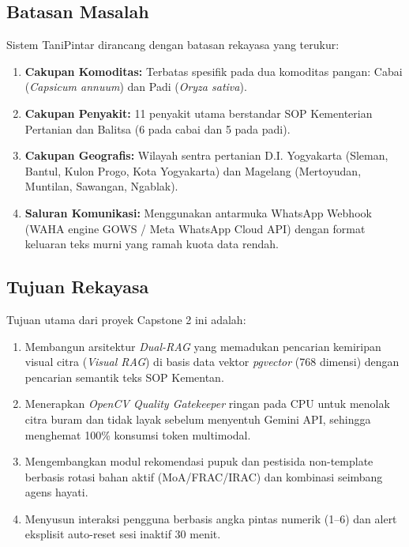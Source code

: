 \documentclass[11pt,a4paper]{article}
\begin{document}
\subsection{Batasan Masalah}
Sistem TaniPintar dirancang dengan batasan rekayasa yang terukur:
\begin{enumerate}
    \item \textbf{Cakupan Komoditas:} Terbatas spesifik pada dua komoditas pangan: Cabai (\textit{Capsicum annuum}) dan Padi (\textit{Oryza sativa}).
    \item \textbf{Cakupan Penyakit:} 11 penyakit utama berstandar SOP Kementerian Pertanian dan Balitsa (6 pada cabai dan 5 pada padi).
    \item \textbf{Cakupan Geografis:} Wilayah sentra pertanian D.I. Yogyakarta (Sleman, Bantul, Kulon Progo, Kota Yogyakarta) dan Magelang (Mertoyudan, Muntilan, Sawangan, Ngablak).
    \item \textbf{Saluran Komunikasi:} Menggunakan antarmuka WhatsApp Webhook (WAHA engine GOWS / Meta WhatsApp Cloud API) dengan format keluaran teks murni yang ramah kuota data rendah.
\end{enumerate}

\subsection{Tujuan Rekayasa}
Tujuan utama dari proyek Capstone 2 ini adalah:
\begin{enumerate}
    \item Membangun arsitektur \textit{Dual-RAG} yang memadukan pencarian kemiripan visual citra (\textit{Visual RAG}) di basis data vektor \textit{pgvector} (768 dimensi) dengan pencarian semantik teks SOP Kementan.
    \item Menerapkan \textit{OpenCV Quality Gatekeeper} ringan pada CPU untuk menolak citra buram dan tidak layak sebelum menyentuh Gemini API, sehingga menghemat 100\% konsumsi token multimodal.
    \item Mengembangkan modul rekomendasi pupuk dan pestisida non-template berbasis rotasi bahan aktif (MoA/FRAC/IRAC) dan kombinasi seimbang agens hayati.
    \item Menyusun interaksi pengguna berbasis angka pintas numerik (1--6) dan alert eksplisit auto-reset sesi inaktif 30 menit.
\end{enumerate}

\end{document}
